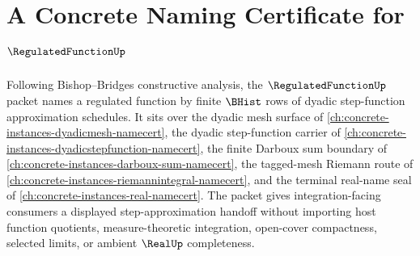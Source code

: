\chapter{A Concrete Naming Certificate for $\RegulatedFunctionUp$}
\label{ch:concrete-instances-regulated-function-namecert}

Following Bishop--Bridges constructive analysis, the $\RegulatedFunctionUp$ packet names a regulated function by finite $\BHist$ rows of dyadic step-function approximation schedules. It sits over the dyadic mesh surface of \autoref{ch:concrete-instances-dyadicmesh-namecert}, the dyadic step-function carrier of \autoref{ch:concrete-instances-dyadicstepfunction-namecert}, the finite Darboux sum boundary of \autoref{ch:concrete-instances-darboux-sum-namecert}, the tagged-mesh Riemann route of \autoref{ch:concrete-instances-riemannintegral-namecert}, and the terminal real-name seal of \autoref{ch:concrete-instances-real-namecert}. The packet gives integration-facing consumers a displayed step-approximation handoff without importing host function quotients, measure-theoretic integration, open-cover compactness, selected limits, or ambient $\RealUp$ completeness.

